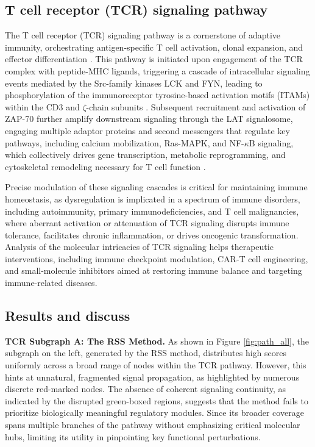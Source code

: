 \subsection{T cell receptor (TCR) signaling pathway}
The T cell receptor (TCR) signaling pathway is a cornerstone of adaptive immunity, orchestrating antigen-specific T cell activation, clonal expansion, and effector differentiation \cite{TCR_1}. 
This pathway is initiated upon engagement of the TCR complex with peptide-MHC ligands, triggering a cascade of intracellular signaling events mediated by the Src-family kinases LCK and FYN, leading to phosphorylation of the immunoreceptor tyrosine-based activation motifs (ITAMs) within the CD3 and $\zeta$-chain subunits \cite{TCR_3}. 
Subsequent recruitment and activation of ZAP-70 further amplify downstream signaling through the LAT signalosome, engaging multiple adaptor proteins and second messengers that regulate key pathways, including calcium mobilization, Ras-MAPK, and NF-$\kappa$B signaling, which collectively drives gene transcription, metabolic reprogramming, and cytoskeletal remodeling necessary for T cell function \cite{TCR_2}. 

Precise modulation of these signaling cascades is critical for maintaining immune homeostasis, as dysregulation is implicated in a spectrum of immune disorders, including autoimmunity, primary immunodeficiencies, and T cell malignancies, where aberrant activation or attenuation of TCR signaling disrupts immune tolerance, facilitates chronic inflammation, or drives oncogenic transformation. 
Analysis of the molecular intricacies of TCR signaling helps therapeutic interventions, including immune checkpoint modulation, CAR-T \cite{CART} cell engineering, and small-molecule inhibitors aimed at restoring immune balance and targeting immune-related diseases.

\subsection{Results and discuss}
\textbf{TCR Subgraph A: The RSS Method. }  
As shown in Figure \ref{fig:path_all}, the subgraph on the left, generated by the RSS method, distributes high scores uniformly across a broad range of nodes within the TCR pathway. 
However, this hints at unnatural, fragmented signal propagation, as highlighted by numerous discrete red-marked nodes. 
The absence of coherent signaling continuity, as indicated by the disrupted green-boxed regions, suggests that the method fails to prioritize biologically meaningful regulatory modules. 
Since its broader coverage spans multiple branches of the pathway without emphasizing critical molecular hubs, limiting its utility in pinpointing key functional perturbations.

